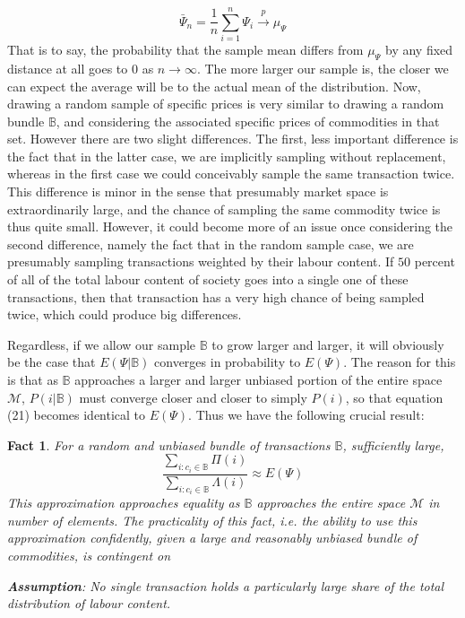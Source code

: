 \documentclass{article}
\theoremstyle{definition}
\theoremstyle{plain}
\theoremstyle{theorem}
\newtheorem{fact}{Fact}[section]
\begin{document}
\[ \bar{\Psi}_n = \frac{1}{n}\sum_{i =1}^n \Psi_i \overset{p}{\to} \mu_{\Psi} \]
That is to say, the probability that the sample mean differs from $\mu_{\Psi}$ by any fixed distance at all goes to $0$ as $n \to \infty$. The more larger our sample is, the closer we can expect the average will be to the actual mean of the distribution. Now, drawing a random sample of specific prices is very similar to drawing a random bundle $\mathbb{B}$, and considering the associated specific prices of commodities in that set. However there are two slight differences. The first, less important difference is the fact that in the latter case, we are implicitly sampling without replacement, whereas in the first case we could conceivably sample the same transaction twice. This difference is minor in the sense that presumably market space is extraordinarily large, and the chance of sampling the same commodity twice is thus quite small. However, it could become more of an issue once considering the second difference, namely the fact that in the random sample case, we are presumably sampling transactions weighted by their labour content. If $50$ percent of all of the total labour content of society goes into a single one of these transactions, then that transaction has a very high chance of being sampled twice, which could produce big differences. \par 
Regardless, if we allow our sample $\mathbb{B}$ to grow larger and larger, it will obviously be the case that $E(\Psi|\mathbb{B})$ converges in probability to $E(\Psi)$. The reason for this is that as $\mathbb{B}$ approaches a larger and larger unbiased portion of the entire space $\mathcal{M}$, $P(i|\mathbb{B})$ must converge closer and closer to simply $P(i)$, so that equation (21) becomes identical to $E(\Psi)$. Thus we have the following crucial result:
\begin{fact}
	For a random and unbiased bundle of transactions $\mathbb{B}$, sufficiently large,
	\[ \frac{\sum_{i: c_i \in \mathbb{B}} \Pi(i)}{\sum_{i: c_i \in \mathbb{B}} \Lambda(i)} \approx E(\Psi) \]
This approximation approaches equality as $\mathbb{B}$ approaches the entire space $\mathcal{M}$ in number of elements. The practicality of this fact, i.e. the ability to use this approximation confidently, given a large and reasonably unbiased bundle of commodities, is contingent on 
\begin{center}
	\textbf{Assumption}: No single transaction holds a particularly large share of the total distribution of labour content.  
\end{center}
\end{fact}
\end{document}
